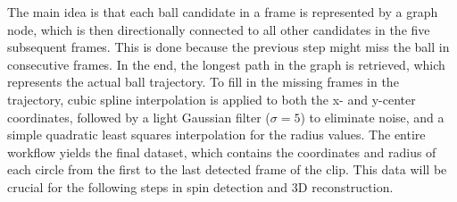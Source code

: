 The main idea is that each ball candidate in a frame is represented by a graph node, which is then directionally connected to all other candidates in the five subsequent frames. This is done because the previous step might miss the ball in consecutive frames. In the end, the longest path in the graph is retrieved, which represents the actual ball trajectory. To fill in the missing frames in the trajectory, cubic spline interpolation is applied to both the x- and y-center coordinates, followed by a light Gaussian filter ($\sigma = 5$) to eliminate noise, and a simple quadratic least squares interpolation for the radius values.
The entire workflow yields the final dataset, which contains the coordinates and radius of each circle from the first to the last detected frame of the clip. This data will be crucial for the following steps in spin detection and 3D reconstruction.
